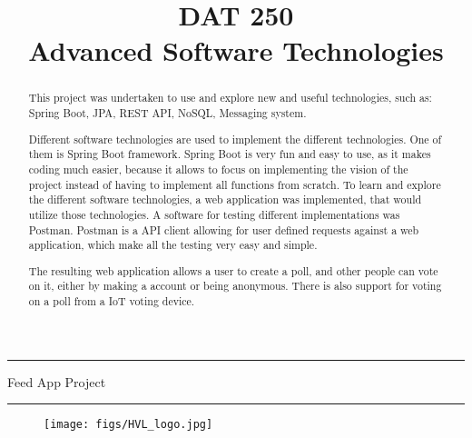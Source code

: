 \documentclass[11pt]{article}
\begin{document}

\title{DAT 250\\Advanced Software Technologies}


\maketitle
\noindent\rule{\textwidth}{1.6pt}\vspace*{\baselineskip}\vspace{2pt}
\vspace{0.75\baselineskip}
{\huge \centering
Feed App Project\\}
\vspace{0.75\baselineskip}
\noindent\rule{\textwidth}{1.6pt}\vspace*{-\baselineskip}\vspace{2pt}
\vspace{9pc}
\begin{figure}[H]
  \centering
  \texttt{[image: figs/HVL\_logo.jpg]}
  \label{fig:logo}
\end{figure}
\newpage

\tableofcontents
\newpage
{}
\begin{abstract}

  This project was undertaken to use and explore new and useful technologies, such as: Spring Boot, JPA, REST API, NoSQL, Messaging system.
  
  Different software technologies are used to implement the different technologies. One of them is Spring Boot framework. Spring Boot is very fun and easy to use, as it makes coding much easier, because it allows to focus on implementing the vision of the project instead of having to implement all functions from scratch. To learn and explore the different software technologies, a web application was implemented, that would utilize those technologies. A software for testing different implementations was Postman. Postman is a API client allowing for user defined requests against a web application, which make all the testing very easy and simple.
  
  The resulting web application allows a user to create a poll, and other people can vote on it, either by making a account or being anonymous. There is also support for voting on a poll from a IoT voting device.

\end{abstract}
\newpage

% 











% 



\end{document}
